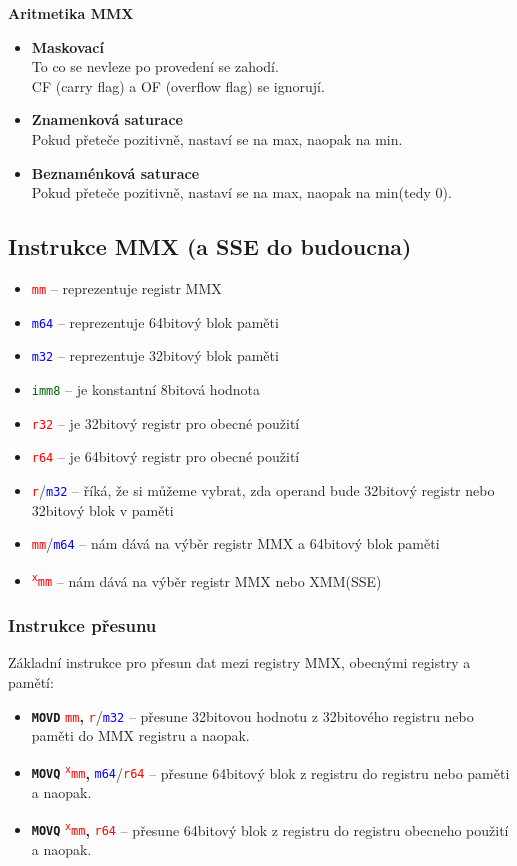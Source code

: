 \documentclass[
]{cz_sablona}
\newcommand{\reg}[1]{\texttt{\textcolor{red}{#1}}}
\newcommand{\mem}[1]{\texttt{\textcolor{blue}{#1}}}
\newcommand{\const}[1]{\texttt{\textcolor{darkgreen}{#1}}}
\newcommand{\instr}[1]{\texttt{\textbf{#1}}}
\begin{document}
\noindent
\textbf{Aritmetika MMX}
\begin{itemize}
    \item \textbf{Maskovací}\\
    To co se nevleze po provedení se zahodí.\\
    CF (carry flag) a OF (overflow flag) se ignorují.
    \item \textbf{Znamenková saturace}\\
    Pokud přeteče pozitivně, nastaví se na max, naopak na min.
    \item \textbf{ Beznaménková saturace}\\
    Pokud přeteče pozitivně, nastaví se na max, naopak na min(tedy 0).
\end{itemize}

\subsection{Instrukce MMX (a SSE do budoucna)}
\noindent
\begin{itemize}
    \item \reg{mm} -- reprezentuje registr MMX
    \item \mem{m64} -- reprezentuje 64bitový blok paměti
    \item \mem{m32} -- reprezentuje 32bitový blok paměti
    \item \const{imm8} -- je konstantní 8bitová hodnota
    \item \reg{r32} -- je 32bitový registr pro obecné použití
    \item \reg{r64} -- je 64bitový registr pro obecné použití
    \item \reg{r}/\mem{m32} -- říká, že si můžeme vybrat, zda operand bude 32bitový registr nebo 32bitový blok v paměti
    \item \reg{mm}/\mem{m64} -- nám dává na výběr registr MMX a 64bitový blok paměti
    \item \reg{\textsuperscript{x}mm} -- nám dává na výběr registr MMX nebo XMM(SSE)
\end{itemize}

\subsubsection{Instrukce přesunu}
\noindent
Základní instrukce pro přesun dat mezi registry MMX, obecnými registry a pamětí:

\begin{itemize}
    \item \instr{MOVD} \reg{mm}\textbf{,} \reg{r}/\mem{m32}
    -- přesune 32bitovou hodnotu z 32bitového registru nebo paměti do MMX registru a naopak.
    \item \instr{MOVQ} \reg{\textsuperscript{x}mm}\textbf{,} \mem{m64}/\reg{r64}
    -- přesune 64bitový blok z registru do registru nebo paměti a naopak.
    \item \instr{MOVQ} \reg{\textsuperscript{x}mm}\textbf{,} \reg{r64}
    -- přesune 64bitový blok z registru do registru obecneho použití a naopak.
\end{itemize}
\end{document}
